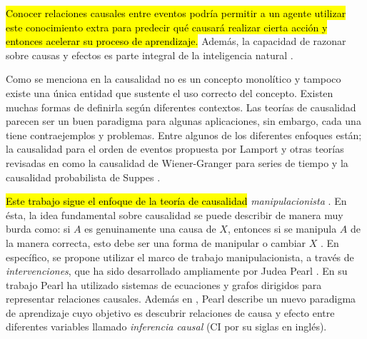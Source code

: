 \hl{Conocer relaciones causales entre eventos podría permitir a un agente 
utilizar este conocimiento extra
para predecir qué causará realizar cierta acción
y entonces acelerar su proceso de aprendizaje.}
Además, la capacidad de razonar sobre causas y efectos es parte integral de
la inteligencia natural \cite{nair2019causal}.

Como se menciona en \cite{theoryofcausalities2006} 
la causalidad no es un concepto monolítico y tampoco
existe una única entidad que sustente el uso correcto
del concepto. Existen muchas formas de definirla según diferentes contextos. Las teorías de causalidad
parecen ser un buen paradigma para algunas aplicaciones,
sin embargo, cada una tiene contraejemplos y problemas.
Entre algunos de los diferentes enfoques 
están; la causalidad para
el orden de eventos propuesta por Lamport \cite{lamport2019time} y otras teorías revisadas en
\cite{holland1986statistics} como la causalidad de Wiener-Granger para
series de tiempo \cite{granger1969investigating} y la 
causalidad probabilista de Suppes \cite{suppes1973probabilistic}. 





\hl{Este trabajo sigue el enfoque de la teoría de causalidad} \textit{manipulacionista} \cite{sep-causation-mani}. En ésta, la idea
fundamental sobre causalidad se puede describir de manera muy burda como: si $A$ es genuinamente una causa de $X$, entonces si se manipula $A$ de la manera correcta, esto debe ser una forma de manipular o cambiar $X$ \cite{campbell1979quasi, woodward2005making}. En específico, 
se propone utilizar el marco de trabajo manipulacionista, a través de \textit{intervenciones}, que
ha sido desarrollado ampliamente por Judea Pearl \cite{pearl_2009}. En su trabajo Pearl ha 
utilizado sistemas de ecuaciones y grafos dirigidos para representar relaciones causales. Además en
\cite{pearl2018bookofwhy}, Pearl describe un nuevo paradigma de aprendizaje cuyo objetivo es descubrir relaciones de causa y efecto entre diferentes variables llamado \textit{inferencia causal} (CI por su siglas en inglés).





